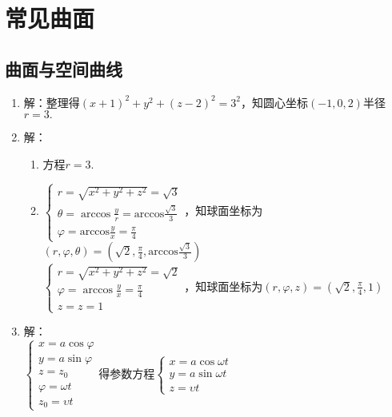 \documentclass[UTF8]{ctexart}
\begin{document}
\section{常见曲面}
\subsection{曲面与空间曲线}
\begin{enumerate}
\item 解：整理得$\left(x+1\right)^2+y^2+\left(z-2\right)^2=3^2$，知圆心坐标$\left(-1,0,2\right)$半径$r=3.$

\item 解：\begin{enumerate}[(1)]
\item 方程$r=3.$
\item $\left\{\begin{array}{l}r=\sqrt{x^2+y^2+z^2}=\sqrt{3}\\\theta=\arccos\displaystyle\frac{y}{r}=\mathrm{arccos}\displaystyle\frac{\sqrt{3}}{3}\\\varphi=\mathrm{arccos}\displaystyle\frac{y}{x}=\displaystyle\frac{\pi}{4}\end{array}\right.$，知球面坐标为$\left(r,\varphi,\theta\right)=\left(\sqrt{2},\displaystyle\frac{\pi}{4},\mathrm{arccos}\displaystyle\frac{\sqrt{3}}{3}\right)$\\
$\left\{\begin{array}{l}r=\sqrt{x^2+y^2+z^2}=\sqrt{2}\\\varphi=\arccos\displaystyle\frac{y}{x}=\displaystyle\frac{\pi}{4}\\z=z=1\end{array}\right.$，知球面坐标为$\left(r,\varphi,z\right)=\left(\sqrt{2},\displaystyle\frac{\pi}{4},1\right)$\\
\end{enumerate}

\item 解：\\$\left\{\begin{array}{l}x=a\cos\varphi\\y=a\sin\varphi\\z=z_0\\\varphi=\omega t\\z_0=\upsilon t\end{array}\right.$得参数方程$\left\{\begin{array}{l}x=a\cos\omega t\\y=a\sin\omega t\\z=\upsilon t\end{array}\right.$


\end{enumerate}
\end{document}
